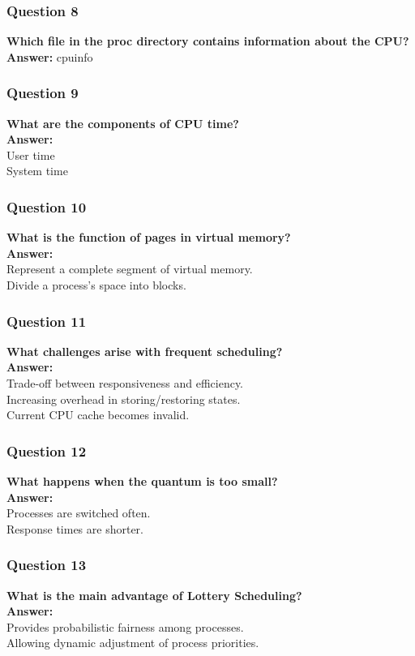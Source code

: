 \documentclass{article}
\begin{document}
\subsubsection*{Question 8}
\textbf{Which file in the proc directory contains information about the CPU?} \\
\textbf{Answer:} cpuinfo

\subsubsection*{Question 9}
\textbf{What are the components of CPU time?} \\
\textbf{Answer:} \\
User time \\
System time

\subsubsection*{Question 10}
\textbf{What is the function of pages in virtual memory?} \\
\textbf{Answer:} \\
Represent a complete segment of virtual memory. \\
Divide a process's space into blocks.

\subsubsection*{Question 11}
\textbf{What challenges arise with frequent scheduling?} \\
\textbf{Answer:} \\
Trade-off between responsiveness and efficiency. \\
Increasing overhead in storing/restoring states. \\
Current CPU cache becomes invalid.

\subsubsection*{Question 12}
\textbf{What happens when the quantum is too small?} \\
\textbf{Answer:} \\
Processes are switched often. \\
Response times are shorter.

\subsubsection*{Question 13}
\textbf{What is the main advantage of Lottery Scheduling?} \\
\textbf{Answer:} \\
Provides probabilistic fairness among processes. \\
Allowing dynamic adjustment of process priorities.
\end{document}
